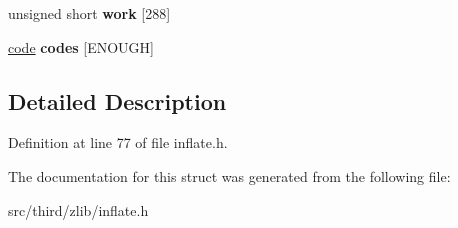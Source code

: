 \begin{DoxyCompactItemize}
\item 
\hypertarget{structinflate__state_a85403907f7f5b9d355821ffa2591456c}{unsigned short {\bfseries work} \mbox{[}288\mbox{]}}\label{d4/d4e/structinflate__state_a85403907f7f5b9d355821ffa2591456c}

\item 
\hypertarget{structinflate__state_af9581f523a7d8d47fba6cdd73eaf1edc}{\hyperlink{structcode}{code} {\bfseries codes} \mbox{[}E\-N\-O\-U\-G\-H\mbox{]}}\label{d4/d4e/structinflate__state_af9581f523a7d8d47fba6cdd73eaf1edc}

\end{DoxyCompactItemize}


\subsection{Detailed Description}


Definition at line 77 of file inflate.\-h.



The documentation for this struct was generated from the following file\-:\begin{DoxyCompactItemize}
\item 
src/third/zlib/inflate.\-h\end{DoxyCompactItemize}
